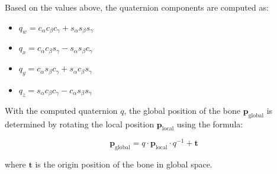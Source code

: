 Based on the values above, the quaternion components are computed as:

\begin{itemize}
	\item $q_w = c_{\alpha} c_{\beta} c_{\gamma} + s_{\alpha} s_{\beta} s_{\gamma}$
	\item $q_x = c_{\alpha} c_{\beta} s_{\gamma} - s_{\alpha} s_{\beta} c_{\gamma}$
	\item $q_y = c_{\alpha} s_{\beta} c_{\gamma} + s_{\alpha} c_{\beta} s_{\gamma}$
	\item $q_z = s_{\alpha} c_{\beta} c_{\gamma} - c_{\alpha} s_{\beta} s_{\gamma}$
\end{itemize}

With the computed quaternion $q$, the global position of the bone $\mathbf{p}_{\text{global}}$ is determined by rotating the local position $\mathbf{p}_{\text{local}}$ using the formula:

\begin{equation}
	\mathbf{p}_{\text{global}} = q \cdot \mathbf{p}_{\text{local}} \cdot q^{-1} + \mathbf{t}
\end{equation}

where $\mathbf{t}$ is the origin position of the bone in global space.
